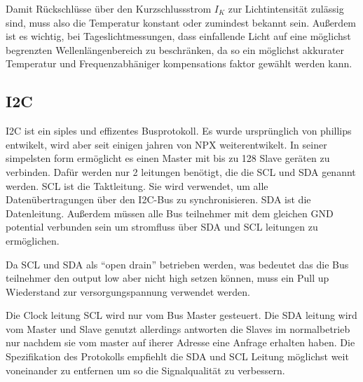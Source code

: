 \noindent Damit Rückschlüsse über den Kurzschlussstrom $I_K$ zur Lichtintensität zulässig sind, muss also die Temperatur konstant oder zumindest bekannt sein.
Außerdem ist es wichtig, bei Tageslichtmessungen, dass einfallende Licht auf eine möglichst begrenzten Wellenlängenbereich zu beschränken, da so ein möglichst akkurater Temperatur und Frequenzabhäniger kompensations faktor gewählt werden kann.
\subsection{I2C}
I2C ist ein siples und effizentes Busprotokoll.
Es wurde ursprünglich von phillips entwikelt, wird aber seit einigen jahren von NPX weiterentwikelt.
In seiner simpelsten form ermöglicht es einen Master mit bis zu 128 Slave geräten zu verbinden.
Dafür werden nur 2 leitungen benötigt, die die SCL und SDA genannt werden. SCL ist die Taktleitung. Sie wird verwendet, um alle Datenübertragungen über den I2C-Bus zu synchronisieren. SDA ist die Datenleitung.
Außerdem müssen alle Bus teilnehmer mit dem gleichen GND potential verbunden sein um stromfluss über SDA und SCL leitungen zu ermöglichen.


Da SCL und SDA als “open drain” betrieben werden, was bedeutet das die Bus teilnehmer den output low aber nicht high setzen können, muss ein Pull up Wiederstand zur versorgungspannung verwendet werden.

Die Clock leitung SCL wird nur vom Bus Master gesteuert.
Die SDA leitung wird vom Master und Slave genutzt allerdings antworten die Slaves im normalbetrieb nur nachdem sie vom master auf iherer Adresse eine Anfrage erhalten haben. 
Die Spezifikation des Protokolls empfiehlt die SDA und SCL Leitung möglichst weit voneinander zu entfernen um so die Signalqualität zu verbessern.

